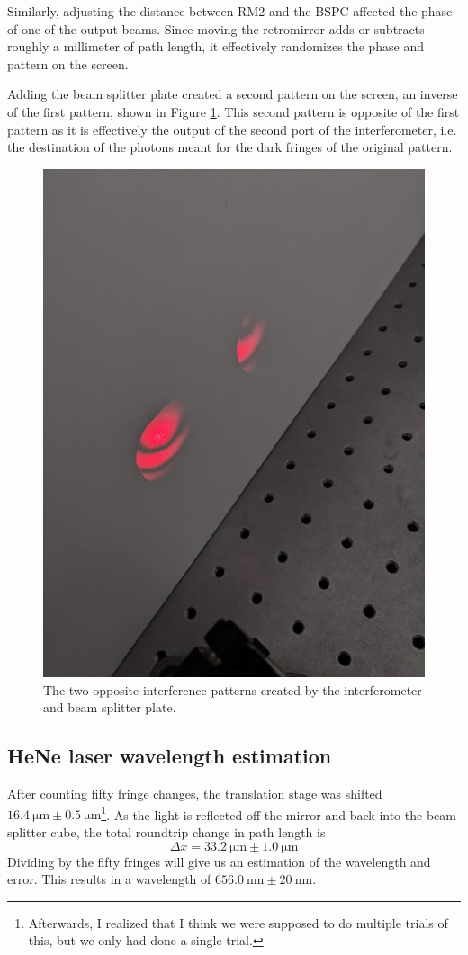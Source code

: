 \documentclass[notitlepage]{report}
\begin{document}
	Similarly, adjusting the distance between RM2 and the BSPC affected the phase of one of the output beams. Since moving the retromirror adds or subtracts roughly a millimeter of path length, it effectively randomizes the phase and pattern on the screen.
	
	Adding the beam splitter plate created a second pattern on the screen, an inverse of the first pattern, shown in Figure \ref{fig:split}. This second pattern is opposite of the first pattern as it is effectively the output of the second port of the interferometer, i.e. the destination of the photons meant for the dark fringes of the original pattern.
	
	\begin{figure}[h]
		\centering
		\includegraphics[width=0.5\linewidth]{PXL_20210204_222253776}
		\caption{The two opposite interference patterns created by the interferometer and beam splitter plate.}
		\label{fig:split}
	\end{figure}
	
	
	\subsection{HeNe laser wavelength estimation}
	After counting fifty fringe changes, the translation stage was shifted $\SI{16.4}{\um} \pm \SI{0.5}{\um}$\footnote{Afterwards, I realized that I think we were supposed to do multiple trials of this, but we only had done a single trial.}. As the light is reflected off the mirror and back into the beam splitter cube, the total roundtrip change in path length is $$\Delta x = \SI{33.2}{\um} \pm \SI{1.0}{\um}$$
	Dividing by the fifty fringes will give us an estimation of the wavelength and error. This results in a wavelength of $\SI{656.0}{\nm} \pm \SI{20}{\nm}$. 
	
\end{document}
